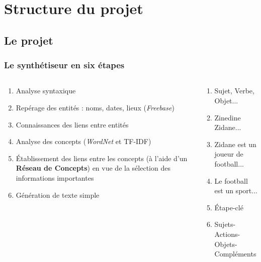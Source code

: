 \documentclass{beamer}
\begin{document}
\section{Structure du projet}

\subsection{Le projet}
\begin{frame}
\frametitle{Le synthétiseur en six étapes}

\begin{columns}

\begin{column}{6cm}
\begin{enumerate}
 \item Analyse syntaxique
 \item Repérage des entités : noms, dates, lieux (\textit{Freebase})
 \item Connaissances des liens entre entités 
 \item Analyse des concepts (\textit{WordNet} et TF-IDF)
 \item Établissement des liens entre les concepts (à l'aide d'un \textbf{Réseau de Concepts}) en vue de la sélection des informations importantes
 \item Génération de texte simple
\end{enumerate}
\end{column}

\begin{column}{6cm}
\begin{enumerate}
\item Sujet, Verbe, Objet...
\item Zinedine Zidane...
\item Zidane est un joueur de football...
\item Le football est un sport...
\item Étape-clé
\item Sujets-Actions-Objets-Compléments
\end{enumerate}

\end{column}
\end{columns}

\end{frame}
\end{document}
